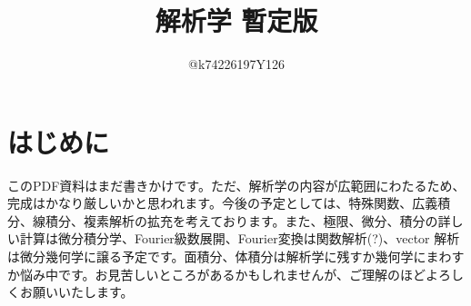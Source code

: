 \documentclass[10pt,a4paper,titlepage]{jsarticle}
\title{解析学 暫定版}
\author{@k74226197Y126}
\begin{document}
\maketitle
{}
\section*{はじめに}
\par
このPDF資料はまだ書きかけです。ただ、解析学の内容が広範囲にわたるため、完成はかなり厳しいかと思われます。今後の予定としては、特殊関数、広義積分、線積分、複素解析の拡充を考えております。また、極限、微分、積分の詳しい計算は微分積分学、Fourier級数展開、Fourier変換は関数解析(?)、vector 解析は微分幾何学に譲る予定です。面積分、体積分は解析学に残すか幾何学にまわすか悩み中です。お見苦しいところがあるかもしれませんが、ご理解のほどよろしくお願いいたします。
\tableofcontents
\clearpage
{}


\clearpage

\clearpage

\clearpage

\clearpage

\clearpage

\clearpage

\clearpage

\clearpage

\clearpage


\clearpage

\clearpage

\clearpage

\clearpage


\clearpage

\clearpage

\clearpage

\clearpage

\clearpage

\clearpage

\clearpage

\clearpage


\clearpage

\clearpage

\clearpage

\clearpage


\clearpage


\clearpage

\clearpage

\clearpage


\clearpage

\clearpage

\clearpage

\clearpage

\clearpage

\clearpage

\clearpage


\clearpage

\clearpage

\clearpage

\clearpage

\clearpage

%
%
%
\end{document}
